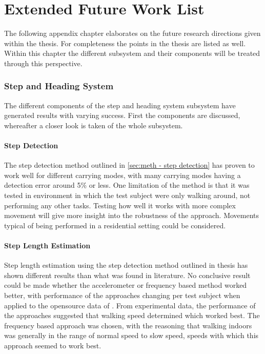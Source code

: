 \chapter{Extended Future Work List}
\label{chap:app-extended_future_work}
The following appendix chapter elaborates on the future research directions given within the thesis. For completeness the points in the thesis are listed as well. Within this chapter the different subsystem and their components will be treated through this perspective.

\subsection*{Step and Heading System }

The different components of the step and heading system subsystem have generated results with varying success. First the components are discussed, whereafter a closer look is taken of the whole subsystem.

\subsubsection*{Step Detection}

The step detection method outlined in \cref{sec:meth - step detection} has proven to work well for different carrying modes, with many carrying modes having a detection error around 5\% or less. One limitation of the method is that it was tested in environment in which the test subject were only walking around, not performing any other tasks. Testing how well it works with more complex movement will give more insight into the robustness of the approach. Movements typical of being performed in a residential setting could be considered.

\subsubsection*{Step Length Estimation}

Step length estimation using the step detection method outlined in thesis has shown different results than what was found in literature. No conclusive result could be made whether the accelerometer or frequency based method worked better, with performance of the approaches changing per test subject when applied to the opensource data of \citet{Vezocnik2019}. From experimental data, the performance of the approaches suggested that walking speed determined which worked best. The frequency based approach was chosen, with the reasoning that walking indoors was generally in the range of normal speed to slow speed, speeds with which this approach seemed to work best. \par 

